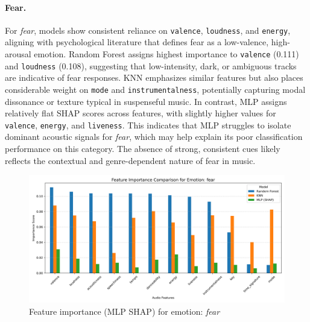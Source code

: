 \documentclass{article}
\begin{document}
\paragraph{Fear.} For \textit{fear}, models show consistent reliance on \texttt{valence}, \texttt{loudness}, and \texttt{energy}, aligning with psychological literature that defines fear as a low-valence, high-arousal emotion. Random Forest assigns highest importance to \texttt{valence} (0.111) and \texttt{loudness} (0.108), suggesting that low-intensity, dark, or ambiguous tracks are indicative of fear responses. KNN emphasizes similar features but also places considerable weight on \texttt{mode} and \texttt{instrumentalness}, potentially capturing modal dissonance or texture typical in suspenseful music. In contrast, MLP assigns relatively flat SHAP scores across features, with slightly higher values for \texttt{valence}, \texttt{energy}, and \texttt{liveness}. This indicates that MLP struggles to isolate dominant acoustic signals for \textit{fear}, which may help explain its poor classification performance on this category. The absence of strong, consistent cues likely reflects the contextual and genre-dependent nature of fear in music.

\begin{figure}[H]
\centering
\includegraphics[width=\linewidth]{Graphics/per_label/fear_feature_importance.png}
\caption{Feature importance (MLP SHAP) for emotion: \textit{fear}}
\label{fig:shap_fear}
\end{figure}
\end{document}
